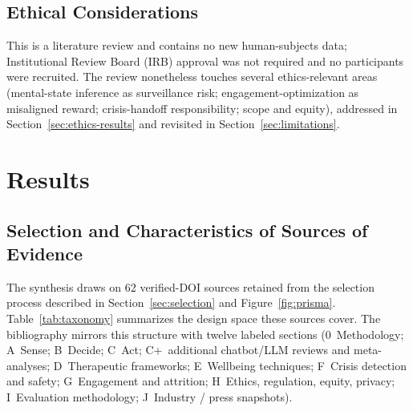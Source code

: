 \documentclass[11pt,a4paper]{article}
\newcommand{\secref}[1]{Section~\ref{#1}}
\newcommand{\tabref}[1]{Table~\ref{#1}}
\newcommand{\figref}[1]{Figure~\ref{#1}}
\begin{document}
\subsection{Ethical Considerations}\label{sec:ethics-methods}

This is a literature review and contains no new human-subjects data;
Institutional Review Board (IRB) approval was not required and no
participants were recruited. The review nonetheless touches several
ethics-relevant areas (mental-state inference as surveillance risk;
engagement-optimization as misaligned reward; crisis-handoff
responsibility; scope and equity), addressed in
\secref{sec:ethics-results} and revisited in
\secref{sec:limitations}.

\section{Results}\label{sec:results}

\subsection{Selection and Characteristics of Sources of Evidence}\label{sec:char}

The synthesis draws on 62 verified-DOI sources retained from the
selection process described in \secref{sec:selection} and
\figref{fig:prisma}. \tabref{tab:taxonomy} summarizes the design
space these sources cover. The bibliography mirrors this structure
with twelve labeled sections (0~Methodology; A~Sense; B~Decide;
C~Act; C+~additional chatbot/LLM reviews and meta-analyses;
D~Therapeutic frameworks; E~Wellbeing techniques; F~Crisis
detection and safety; G~Engagement and attrition; H~Ethics,
regulation, equity, privacy; I~Evaluation methodology; J~Industry
/ press snapshots).
\end{document}
